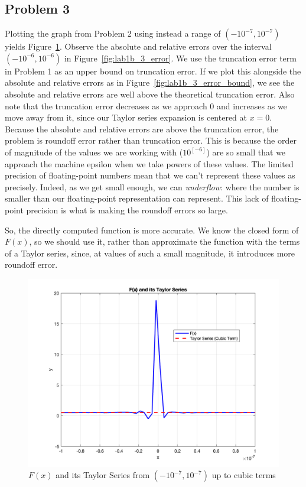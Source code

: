 \documentclass[11pt]{article}
\begin{document}
\subsection{Problem 3}

Plotting the graph from Problem 2 using instead a range of $(-10^{-7}, 10^{-7})$ yields Figure~\ref{fig:lab1b_3}. Observe the absolute and relative errors over the interval $(-10^{-6}, 10^{-6})$ in Figure~\ref{fig:lab1b_3_error}. We use the truncation error term in Problem 1 as an upper bound on truncation error. If we plot this alongside the absolute and relative errors as in Figure~\ref{fig:lab1b_3_error_bound}, we see the absolute and relative errors are well above the theoretical truncation error. Also note that the truncation error decreases as we approach 0 and increases as we move away from it, since our Taylor series expansion is centered at $x = 0$. Because the absolute and relative errors are above the truncation error, the problem is roundoff error rather than truncation error. This is because the order of magnitude of the values we are working with ($10^[-6]$) are so small that we approach the machine epsilon when we take powers of these values. The limited precision of floating-point numbers mean that we can't represent these values as precisely. Indeed, as we get small enough, we can \textit{underflow}: where the number is smaller than our floating-point representation can represent. This lack of floating-point precision is what is making the roundoff errors so large.

So, the directly computed function is more accurate. We know the closed form of $F(x)$, so we should use it, rather than approximate the function with the terms of a Taylor series, since, at values of such a small magnitude, it introduces more roundoff error.

\begin{figure}[h!]
  \centering
  \includegraphics[width=0.8\linewidth]{lab1b_3.png}
  \caption{$F(x)$ and its Taylor Series from $(-10^{-7}, 10^{-7})$ up to cubic terms}
  \label{fig:lab1b_3}
\end{figure}
\end{document}
